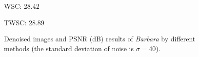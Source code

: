 \begin{figure}
\begin{adjustwidth}{-2cm}{}
{\begin{minipage}[t]{0.19\textwidth}
{\footnotesize WSC: 28.42}
\end{minipage}
\begin{minipage}[t]{0.19\textwidth}
\centering
{}
{\footnotesize TWSC: 28.89}
\end{minipage}
}
\caption{Denoised images and PSNR (dB) results of \textsl{Barbara} by different methods (the standard deviation of noise is $\sigma=40$).}
    \label{fig5-3}
\end{adjustwidth}
\end{figure}


